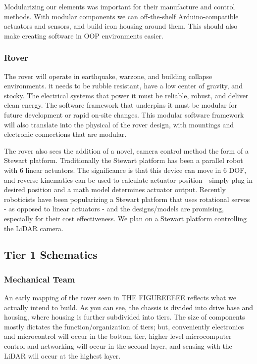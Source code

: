 \documentclass[a4paper, 10pt]{article}
\begin{document}
		Modularizing our elements was important for their manufacture and control methods. With modular components we can off-the-shelf Arduino-compatible actuators and sensors, and build icon housing around them. This should also make creating software in OOP environments easier. 		
		
		\subsubsection*{Rover}
		The rover will operate in earthquake, warzone, and building collapse environments. it needs to be rubble resistant, have a low center of gravity, and stocky. The electrical systems that power it must be reliable, robust, and deliver clean energy. The software framework that underpins it must be modular for future development or rapid on-site changes. This modular software framework will also translate into the physical of the rover design, with mountings and electronic connections that are modular.
		
		The rover also sees the addition of a novel, camera control method the form of a Stewart platform. Traditionally the Stewart platform has been a parallel robot with 6 linear actuators. The significance is that this device can move in 6 DOF, and reverse kinematics can be used to calculate actuator position - simply plug in desired position and a math model determines actuator output. Recently roboticists have been popularizing a Stewart platform that uses rotational servos - as opposed to linear actuators - and the designs/models are promising, especially for their cost effectiveness. We plan on a Stewart platform controlling the LiDAR camera.

	\subsection{Tier 1 Schematics}
		\subsubsection{Mechanical Team}
		An early mapping of the rover seen in THE FIGUREEEEE reflects what we actually intend to build. As you can see, the chassis is divided into drive base and housing, where housing is further subdivided into tiers. The size of components mostly dictates the function/organization of tiers; but, conveniently electronics and microcontrol will occur in the bottom tier, higher level microcomputer control and networking will occur in the second layer, and sensing with the LiDAR will occur at the highest layer.
		
\end{document}
